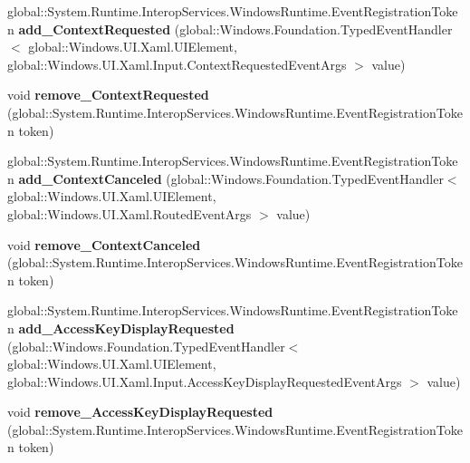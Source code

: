 \begin{DoxyCompactItemize}
global\+::\+System.\+Runtime.\+Interop\+Services.\+Windows\+Runtime.\+Event\+Registration\+Token {\bfseries add\+\_\+\+Context\+Requested} (global\+::\+Windows.\+Foundation.\+Typed\+Event\+Handler$<$ global\+::\+Windows.\+U\+I.\+Xaml.\+U\+I\+Element, global\+::\+Windows.\+U\+I.\+Xaml.\+Input.\+Context\+Requested\+Event\+Args $>$ value)
\item 
\mbox{\label{interface_windows_1_1_u_i_1_1_xaml_1_1_i_u_i_element4_abdaa8213b321663c768808ee50570eb8}} 
void {\bfseries remove\+\_\+\+Context\+Requested} (global\+::\+System.\+Runtime.\+Interop\+Services.\+Windows\+Runtime.\+Event\+Registration\+Token token)
\item 
\mbox{\label{interface_windows_1_1_u_i_1_1_xaml_1_1_i_u_i_element4_a9ade4191c6e4d4e8692b363604d2e6cf}} 
global\+::\+System.\+Runtime.\+Interop\+Services.\+Windows\+Runtime.\+Event\+Registration\+Token {\bfseries add\+\_\+\+Context\+Canceled} (global\+::\+Windows.\+Foundation.\+Typed\+Event\+Handler$<$ global\+::\+Windows.\+U\+I.\+Xaml.\+U\+I\+Element, global\+::\+Windows.\+U\+I.\+Xaml.\+Routed\+Event\+Args $>$ value)
\item 
\mbox{\label{interface_windows_1_1_u_i_1_1_xaml_1_1_i_u_i_element4_ac9d7657d497cc4bd420335a23752824f}} 
void {\bfseries remove\+\_\+\+Context\+Canceled} (global\+::\+System.\+Runtime.\+Interop\+Services.\+Windows\+Runtime.\+Event\+Registration\+Token token)
\item 
\mbox{\label{interface_windows_1_1_u_i_1_1_xaml_1_1_i_u_i_element4_a35fc44f1af8aacfcb2a3ff829fcb7d50}} 
global\+::\+System.\+Runtime.\+Interop\+Services.\+Windows\+Runtime.\+Event\+Registration\+Token {\bfseries add\+\_\+\+Access\+Key\+Display\+Requested} (global\+::\+Windows.\+Foundation.\+Typed\+Event\+Handler$<$ global\+::\+Windows.\+U\+I.\+Xaml.\+U\+I\+Element, global\+::\+Windows.\+U\+I.\+Xaml.\+Input.\+Access\+Key\+Display\+Requested\+Event\+Args $>$ value)
\item 
\mbox{\label{interface_windows_1_1_u_i_1_1_xaml_1_1_i_u_i_element4_aea049ec23f1d2f3b558644a30bbda62d}} 
void {\bfseries remove\+\_\+\+Access\+Key\+Display\+Requested} (global\+::\+System.\+Runtime.\+Interop\+Services.\+Windows\+Runtime.\+Event\+Registration\+Token token)

\end{DoxyCompactItemize}
